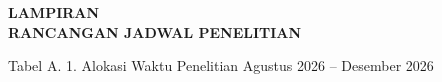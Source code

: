 

\clearpage
{}
{}

\begin{center}
  {\bfseries\fontsize{12pt}{14pt}\selectfont LAMPIRAN}\\[1.5ex]
  {\bfseries\fontsize{12pt}{14pt}\selectfont RANCANGAN JADWAL PENELITIAN}
\end{center}

\vspace{1.5em}

\noindent Tabel A. 1. Alokasi Waktu Penelitian Agustus 2026 -- Desember 2026

\vspace{0.8em}
\noindent
